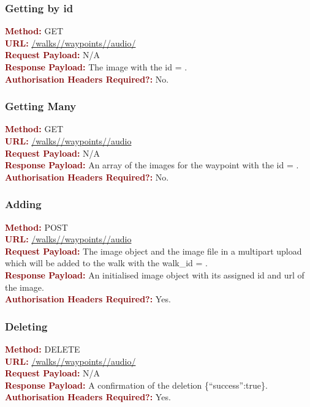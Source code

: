 \documentclass[11pt,a4paper]{report}
\begin{document}
\subsubsection{Getting by id}
\textbf{\textcolor{Maroon}{Method:}} GET\\
\textbf{\textcolor{Maroon}{URL:}} \url{/walks/}\url{/waypoints/}\url{/audio/}\\
\textbf{\textcolor{Maroon}{Request Payload:}} N/A\\
\textbf{\textcolor{Maroon}{Response Payload:}} The image with the id = .\\
\textbf{\textcolor{Maroon}{Authorisation Headers Required?:}} No.

\subsubsection{Getting Many}
\textbf{\textcolor{Maroon}{Method:}} GET\\
\textbf{\textcolor{Maroon}{URL:}} \url{/walks/}\url{/waypoints/}\url{/audio}\\
\textbf{\textcolor{Maroon}{Request Payload:}} N/A\\
\textbf{\textcolor{Maroon}{Response Payload:}} An array of the images for the waypoint with the id = .\\
\textbf{\textcolor{Maroon}{Authorisation Headers Required?:}} No.

\subsubsection{Adding}
\textbf{\textcolor{Maroon}{Method:}} POST\\
\textbf{\textcolor{Maroon}{URL:}} \url{/walks/}\url{/waypoints/}\url{/audio}\\
\textbf{\textcolor{Maroon}{Request Payload:}} The image object and the image file in a multipart upload which will be added to the walk with the walk\_id = .\\
\textbf{\textcolor{Maroon}{Response Payload:}} An initialised image object with its assigned id and url of the image.\\
\textbf{\textcolor{Maroon}{Authorisation Headers Required?:}} Yes.

\subsubsection{Deleting}
\textbf{\textcolor{Maroon}{Method:}} DELETE\\
\textbf{\textcolor{Maroon}{URL:}} \url{/walks/}\url{/waypoints/}\url{/audio/}\\
\textbf{\textcolor{Maroon}{Request Payload:}} N/A\\
\textbf{\textcolor{Maroon}{Response Payload:}} A confirmation of the deletion \{``success'':true\}.\\
\textbf{\textcolor{Maroon}{Authorisation Headers Required?:}} Yes.
\end{document}
